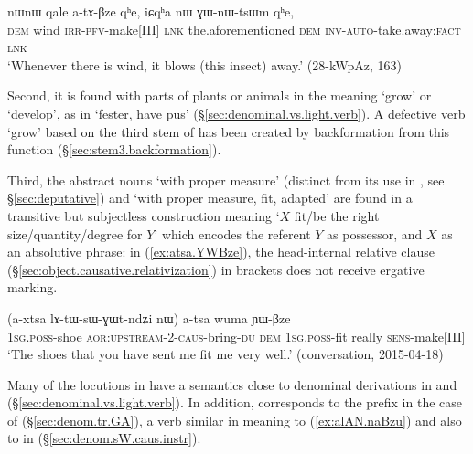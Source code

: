\begin{exe}
\ex \label{ex:qale.atABze}
\gll nɯnɯ qale a-tɤ-βze qʰe, iɕqʰa nɯ ɣɯ-nɯ-tsɯm qʰe,  \\
\textsc{dem} wind \textsc{irr}-\textsc{pfv}-make[III] \textsc{lnk}  the.aforementioned \textsc{dem} \textsc{inv}-\textsc{auto}-take.away:\textsc{fact} \textsc{lnk} \\
\glt `Whenever there is wind, it blows (this insect) away.' (28-kWpAz, 163)
\end{exe}

Second, it is found with parts of plants or animals in the meaning `grow' or `develop', as in  `fester, have pus' (§\ref{sec:denominal.vs.light.verb}). A defective verb  `grow' based on the third stem of  has been created by backformation from this function (§\ref{sec:stem3.backformation}).

Third, the abstract nouns  `with proper measure' (distinct from its use in , see §\ref{sec:deputative}) and  `with proper measure, fit, adapted' are found in a transitive but subjectless construction meaning `$X$ fit/be the right size/quantity/degree for $Y$' which encodes the referent $Y$ as possessor, and  $X$ as an absolutive phrase: in (\ref{ex:atsa.YWBze}), the head-internal relative clause (§\ref{sec:object.causative.relativization}) in brackets does not receive ergative marking.
 
 \begin{exe}
\ex \label{ex:atsa.YWBze}
\gll  (a-xtsa lɤ-tɯ-sɯ-ɣɯt-ndʑi nɯ) a-tsa wuma ɲɯ-βze \\
\textsc{1sg}.\textsc{poss}-shoe \textsc{aor}:\textsc{upstream}-2-\textsc{caus}-bring-\textsc{du} \textsc{dem}    \textsc{1sg}.\textsc{poss}-fit really \textsc{sens}-make[III] \\
 \glt `The shoes that you have sent me fit me very well.' (conversation, 2015-04-18)
 \end{exe}

Many of the locutions in  have a semantics close to denominal derivations in  and  (§\ref{sec:denominal.vs.light.verb}).  In addition,  corresponds to the  prefix in the case of  (§\ref{sec:denom.tr.GA}), a verb similar in meaning to  (\ref{ex:alAN.naBzu}) and also to  in  (§\ref{sec:denom.sW.caus.instr}).
 
